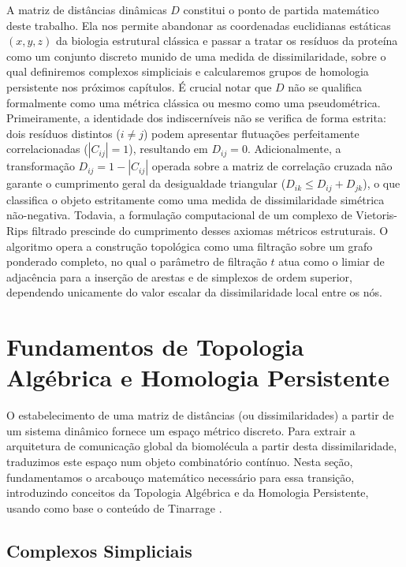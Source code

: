 \documentclass[12pt, a4paper]{article}
\theoremstyle{plain}
\theoremstyle{definition}
\theoremstyle{remark}
\newcommand{\ident}{\hspace{2em}}
\begin{document}
\ident A matriz de distâncias dinâmicas $D$ constitui o ponto de partida matemático deste trabalho. Ela nos permite abandonar as coordenadas euclidianas estáticas $(x, y, z)$ da biologia estrutural clássica e passar a tratar os resíduos da proteína como um conjunto discreto munido de uma medida de dissimilaridade, sobre o qual definiremos complexos simpliciais e calcularemos grupos de homologia persistente nos próximos capítulos. É crucial notar que $D$ não se qualifica formalmente como uma métrica clássica ou mesmo como uma pseudométrica. Primeiramente, a identidade dos indiscerníveis não se verifica de forma estrita: dois resíduos distintos ($i \neq j$) podem apresentar flutuações perfeitamente correlacionadas ($|C_{ij}| = 1$), resultando em $D_{ij} = 0$. Adicionalmente, a transformação $D_{ij} = 1 - |C_{ij}|$ operada sobre a matriz de correlação cruzada não garante o cumprimento geral da desigualdade triangular ($D_{ik} \leq D_{ij} + D_{jk}$), o que classifica o objeto estritamente como uma medida de dissimilaridade simétrica não-negativa. Todavia, a formulação computacional de um complexo de Vietoris-Rips filtrado prescinde do cumprimento desses axiomas métricos estruturais. O algoritmo opera a construção topológica como uma filtração sobre um grafo ponderado completo, no qual o parâmetro de filtração $t$ atua como o limiar de adjacência para a inserção de arestas e de simplexos de ordem superior, dependendo unicamente do valor escalar da dissimilaridade local entre os nós.


\section{Fundamentos de Topologia Algébrica e Homologia Persistente} \label{sec:homologia_persistente}

\ident O estabelecimento de uma matriz de distâncias (ou dissimilaridades) a partir de um sistema dinâmico fornece um espaço métrico discreto. Para extrair a arquitetura de comunicação global da biomolécula a partir desta dissimilaridade, traduzimos este espaço num objeto combinatório contínuo. Nesta seção, fundamentamos o arcabouço matemático necessário para essa transição, introduzindo conceitos da Topologia Algébrica e da Homologia Persistente, usando como base o conteúdo de Tinarrage \cite{tinarrage2021}.

\subsection{Complexos Simpliciais} 
\end{document}
